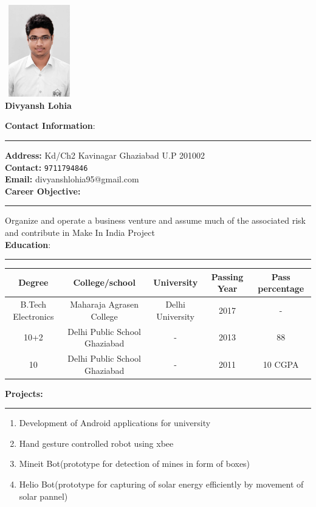 \documentclass[a4paper,10pt]{article}
\begin{document}
\begin{flushright}
\includegraphics[width=3cm, height=4cm]{dev.jpg}\\
\large
\textbf{\bigskip Divyansh Lohia}
\end{flushright}


\begin{flushleft}
	\textbf{\large Contact Information}:\\
	\hrule
	\bigskip
	\textbf{Address:}            Kd/Ch2 Kavinagar Ghaziabad U.P 201002\\
	\textbf{Contact:}   \texttt{9711794846}\\
	\textbf{Email:}             divyanshlohia95@gmail.com\\ 
	\bigskip
    \textbf{\large Career Objective:}\\
    \hrule
    \smallskip
    Organize and operate a business venture and assume much of the associated risk and contribute in Make 	In India Project\\
	\bigskip
	\textbf{\large  Education}:\\
	\hrule
	\bigskip
	\begin{tabular}{|c|c|c|c|c|}
   		\hline \textbf{ Degree}  & \textbf{College/school}  & \textbf{University} & \textbf{Passing Year} 			& 		\textbf{ Pass percentage} \\ 
   		\hline B.Tech Electronics & Maharaja Agrasen College  & Delhi University & 2017 & - \\ 
   		\hline 
			10+2 & Delhi Public School Ghaziabad & - & 2013 & 88 \\
    	\hline
    		10 & Delhi Public School Ghaziabad & - & 2011 & 10 CGPA \\
    		\hline
	\end{tabular}
    \textbf{\large Projects:}\\
    \hrule
      \begin{enumerate}
      	\item  Development of Android applications for university
      	\item  Hand gesture controlled robot using xbee
      	\item  Mineit Bot(prototype for detection of mines in form of boxes)
      	\item  Helio Bot(prototype for capturing of solar energy efficiently by movement of solar pannel)
      \end{enumerate}
\end{flushleft}
\end{document}
